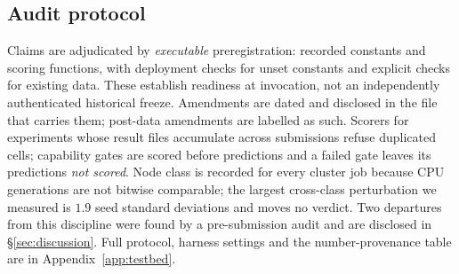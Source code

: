 \subsection{Audit protocol}

Claims are adjudicated by \emph{executable} preregistration: recorded constants
and scoring functions, with deployment checks for unset constants and explicit
checks for existing data. These establish readiness at invocation, not an
independently authenticated historical freeze. Amendments are dated and disclosed in the file that carries
them; post-data amendments are labelled as such. Scorers for experiments whose
result files accumulate across submissions refuse duplicated cells; capability
gates are scored before predictions and a failed gate leaves its predictions
\emph{not scored}. Node class is recorded for every cluster job because CPU
generations are not bitwise comparable; the largest cross-class perturbation
we measured is $1.9$ seed standard deviations and moves no verdict. Two
departures from this discipline were found by a pre-submission audit and are
disclosed in \S\ref{sec:discussion}. Full protocol, harness settings and the
number-provenance table are in Appendix~\ref{app:testbed}.
